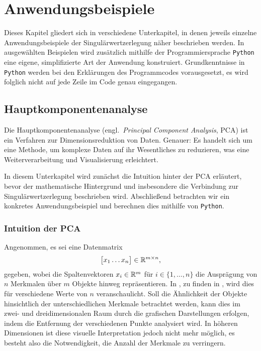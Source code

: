 \chapter{Anwendungsbeispiele}   
Dieses Kapitel gliedert sich in verschiedene Unterkapitel, in denen jeweils einzelne Anwendungsbeispiele der Singulärwertzerlegung näher beschrieben werden.
In ausgewählten Beispielen wird zusätzlich mithilfe der Programmiersprache \texttt{Python} eine eigene, simplifizierte Art der Anwendung konstruiert.
Grundkenntnisse in \texttt{Python} werden bei den Erklärungen des Programmcodes vorausgesetzt, es wird folglich nicht auf jede Zeile im Code genau eingegangen.

\section{Hauptkomponentenanalyse}

Die Hauptkomponentenanalyse (engl.\ \textit{Principal Component Analysis}, PCA) ist ein Verfahren zur Dimensionsreduktion von Daten.
Genauer: Es handelt sich um eine Methode, um komplexe Daten auf ihr Wesentliches zu reduzieren, was eine Weiterverarbeitung und Visualisierung erleichtert.

In diesem Unterkapitel wird zunächst die Intuition hinter der PCA erläutert, bevor der mathematische Hintergrund und insbesondere die Verbindung zur Singulärwertzerlegung beschrieben wird.
Abschließend betrachten wir ein konkretes Anwendungsbeispiel und berechnen dies mithilfe von \texttt{Python}.

\subsection{Intuition der PCA}
Angenommen, es sei eine Datenmatrix
\begin{equation*}
    \big[
        \begin{matrix}
            x_1 \dots x_n
        \end{matrix}    
    \big] \in \mathbb{R}^{m \times n},
\end{equation*}
gegeben, wobei die Spaltenvektoren \(x_i \in \mathbb{R}^{m}\) für \(i \in \{1,\ldots,n\}\) die Ausprägung von \(n\) Merkmalen über \(m\) Objekte hinweg repräsentieren.
In , zu finden in , wird dies für verschiedene Werte von \(n\) veranschaulicht.
Soll die Ähnlichkeit der Objekte hinsichtlich der unterschiedlichen Merkmale betrachtet werden, kann dies im zwei- und dreidimensionalen Raum durch die grafischen Darstellungen erfolgen, indem die Entfernung der verschiedenen Punkte analysiert wird.
In höheren Dimensionen ist diese visuelle Interpretation jedoch nicht mehr möglich, es besteht also die Notwendigkeit, die Anzahl der Merkmale zu verringern.


